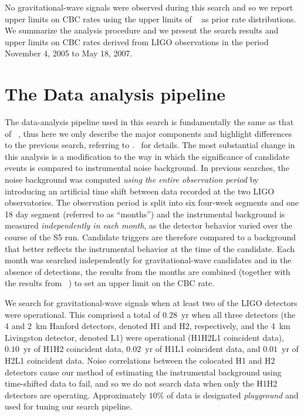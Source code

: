 No gravitational-wave signals were observed during this search and so we
report upper limits on CBC rates using the upper limits of 
~\cite{Collaboration:2009tt} as prior rate distributions. We summarize the 
analysis procedure and we present the search results and upper limits on CBC 
rates derived from \ac{LIGO} observations in the period November 4, 2005 to May
18, 2007.

\section{The Data analysis pipeline}
\label{sec:pipeline}

The data-analysis pipeline used in this search is fundamentally the same as
that of ~\cite{Collaboration:2009tt}, thus here we only describe the major 
components and highlight differences to the previous search, referring to 
.~\cite{LIGOS3S4all,Collaboration:2009tt} for details. The most substantial
change in this analysis is a modification to the way in which the significance
of candidate events is compared to instrumental noise background. In previous
searches, the noise background was computed \emph{using the entire observation
period} by introducing an artificial time shift between data recorded at the
two LIGO observatories. The observation period is split into six four-week 
segments and one 18 day segment (referred to as ``months'') and the 
instrumental background is measured \emph{independently in each month}, as the
detector behavior varied over the course of the S5 run. Candidate triggers are
therefore compared to a background that better reflects the instrumental 
behavior at the time of the candidate.  Each month was searched independently 
for gravitational-wave candidates and in the absence of detections, the results
from the months are combined (together with the results from
~\cite{Collaboration:2009tt}) to set an upper limit on the CBC rate.

We search for gravitational-wave signals when at least two of the \ac{LIGO}
detectors were operational.  This comprised a total of $0.28$~yr when all three
detectors (the 4 and 2~km Hanford detectors, denoted H1 and H2, respectively, 
and the 4~km Livingston detector, denoted L1) were operational 
(H1H2L1 coincident data), $0.10$~yr of H1H2 coincident data, $0.02$~yr of H1L1 
coincident data, and $0.01$~yr of H2L1 coincident data.  Noise correlations 
between the colocated H1 and H2 detectors cause our method of estimating the 
instrumental background using time-shifted data to fail, and so we do not 
search data when only the H1H2 detectors are operating. Approximately $10\%$ of
data is designated \textit{playground} and used for tuning our search pipeline.

